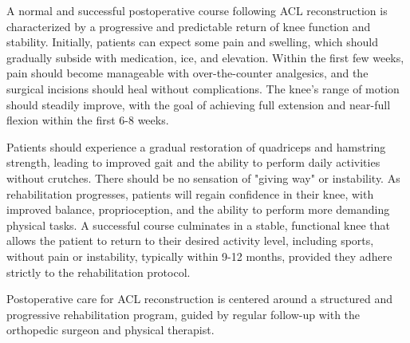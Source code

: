 A normal and successful postoperative course following ACL reconstruction is characterized by a progressive and predictable return of knee function and stability. Initially, patients can expect some pain and swelling, which should gradually subside with medication, ice, and elevation. Within the first few weeks, pain should become manageable with over-the-counter analgesics, and the surgical incisions should heal without complications. The knee's range of motion should steadily improve, with the goal of achieving full extension and near-full flexion within the first 6-8 weeks.

Patients should experience a gradual restoration of quadriceps and hamstring strength, leading to improved gait and the ability to perform daily activities without crutches. There should be no sensation of "giving way" or instability. As rehabilitation progresses, patients will regain confidence in their knee, with improved balance, proprioception, and the ability to perform more demanding physical tasks. A successful course culminates in a stable, functional knee that allows the patient to return to their desired activity level, including sports, without pain or instability, typically within 9-12 months, provided they adhere strictly to the rehabilitation protocol.

Postoperative care for ACL reconstruction is centered around a structured and progressive rehabilitation program, guided by regular follow-up with the orthopedic surgeon and physical therapist.

